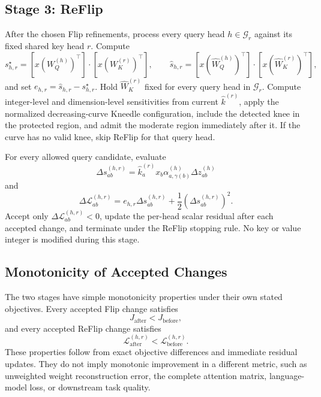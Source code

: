 \subsection{Stage 3: ReFlip}

After the chosen Flip refinements, process every query head $h\in\mathcal{G}_r$ against its fixed shared key head $r$. Compute
\begin{equation}
s_{h,r}^\star
=
\left[x(W_Q^{(h)})^\top\right]\cdot
\left[x(W_K^{(r)})^\top\right],
\qquad
\hat{s}_{h,r}
=
\left[x(\hat W_Q^{(h)})^\top\right]\cdot
\left[x(\hat W_K^{(r)})^\top\right],
\end{equation}
and set $e_{h,r}=\hat{s}_{h,r}-s_{h,r}^\star$. Hold $\hat W_K^{(r)}$ fixed for every query head in $\mathcal{G}_r$. Compute integer-level and dimension-level sensitivities from current $\hat k^{(r)}$, apply the normalized decreasing-curve Kneedle configuration, include the detected knee in the protected region, and admit the moderate region immediately after it. If the curve has no valid knee, skip ReFlip for that query head.

For every allowed query candidate, evaluate
\begin{equation}
\Delta s^{(h,r)}_{ab}
=
\hat k^{(r)}_a x_b
\alpha^{(h)}_{a,\gamma(b)}
\Delta z^{(h)}_{ab}
\end{equation}
and
\begin{equation}
\Delta\mathcal{L}^{(h,r)}_{ab}
=
e_{h,r}\Delta s^{(h,r)}_{ab}
+\frac{1}{2}\left(\Delta s^{(h,r)}_{ab}\right)^2.
\end{equation}
Accept only $\Delta\mathcal{L}^{(h,r)}_{ab}<0$, update the per-head scalar residual after each accepted change, and terminate under the ReFlip stopping rule. No key or value integer is modified during this stage.

\subsection{Monotonicity of Accepted Changes}

The two stages have simple monotonicity properties under their own stated objectives. Every accepted Flip change satisfies
\begin{equation}
J_{\mathrm{after}}<J_{\mathrm{before}},
\end{equation}
and every accepted ReFlip change satisfies
\begin{equation}
\mathcal{L}^{(h,r)}_{\mathrm{after}}
<
\mathcal{L}^{(h,r)}_{\mathrm{before}}.
\end{equation}
These properties follow from exact objective differences and immediate residual updates. They do not imply monotonic improvement in a different metric, such as unweighted weight reconstruction error, the complete attention matrix, language-model loss, or downstream task quality.

